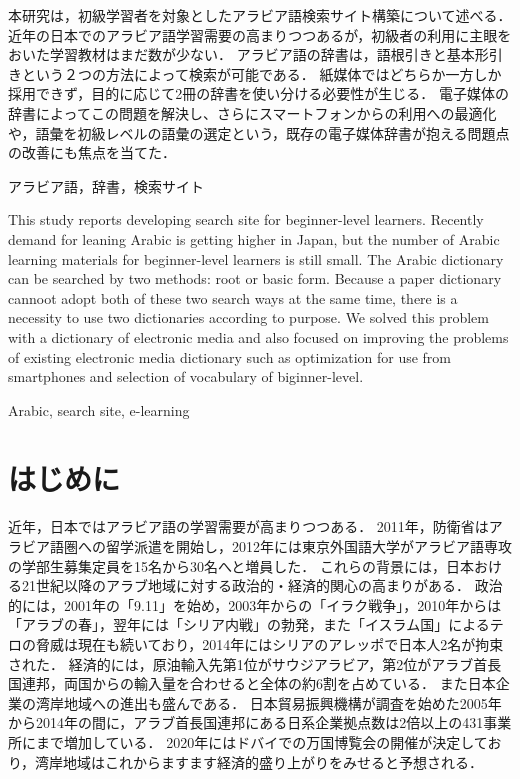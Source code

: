 \documentclass[technicalreport]{ieicej}
\begin{document}
\setarab
\begin{jabstract}
本研究は，初級学習者を対象としたアラビア語検索サイト構築について述べる．
近年の日本でのアラビア語学習需要の高まりつつあるが，初級者の利用に主眼をおいた学習教材はまだ数が少ない．
アラビア語の辞書は，語根引きと基本形引きという２つの方法によって検索が可能である．
紙媒体ではどちらか一方しか採用できず，目的に応じて2冊の辞書を使い分ける必要性が生じる．
電子媒体の辞書によってこの問題を解決し、さらにスマートフォンからの利用への最適化や，語彙を初級レベルの語彙の選定という，既存の電子媒体辞書が抱える問題点の改善にも焦点を当てた．

\end{jabstract}
\begin{jkeyword}
アラビア語，辞書，検索サイト
\end{jkeyword}
\begin{eabstract}
This study reports developing search site for beginner-level learners.
Recently demand for leaning Arabic is getting higher in Japan, but the number of Arabic learning materials for beginner-level learners is still small.
The Arabic dictionary can be searched by two methods: root or basic form.
Because a paper dictionary cannoot adopt both of these two search ways at the same time, there is a necessity to use two dictionaries according to purpose.
We solved this problem with a dictionary of electronic media and also focused on improving the problems of existing electronic media dictionary such as optimization for use from smartphones and selection of vocabulary of biginner-level.

\end{eabstract}
\begin{ekeyword}
Arabic, search site, e-learning
\end{ekeyword}
\maketitle
\section{はじめに}
近年，日本ではアラビア語の学習需要が高まりつつある．
2011年，防衛省はアラビア語圏への留学派遣を開始し\cite{nikkei}，2012年には東京外国語大学がアラビア語専攻の学部生募集定員を15名から30名へと増員した．
これらの背景には，日本おける21世紀以降のアラブ地域に対する政治的・経済的関心の高まりがある．
政治的には，2001年の「9.11」を始め，2003年からの「イラク戦争」，2010年からは「アラブの春」，翌年には「シリア内戦」の勃発，また「イスラム国」によるテロの脅威は現在も続いており，2014年にはシリアのアレッポで日本人2名が拘束された．
経済的には，原油輸入先第1位がサウジアラビア，第2位がアラブ首長国連邦，両国からの輸入量を合わせると全体の約6割を占めている\cite{teikoku}．
また日本企業の湾岸地域への進出も盛んである．
日本貿易振興機構が調査を始めた2005年から2014年の間に，アラブ首長国連邦にある日系企業拠点数は2倍以上の431事業所にまで増加している\cite{jetro}．
2020年にはドバイでの万国博覧会の開催が決定しており，湾岸地域はこれからますます経済的盛り上がりをみせると予想される．
\end{document}
